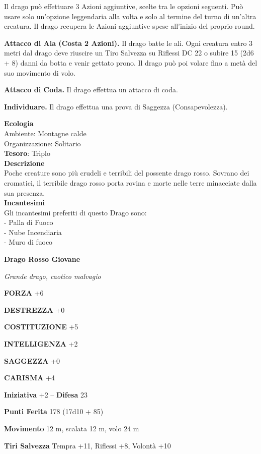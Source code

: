 \begin{multicols}{2}
Il drago può effettuare 3 Azioni aggiuntive, scelte tra le opzioni seguenti. Può usare solo un'opzione leggendaria alla volta e solo al termine del turno di un'altra creatura. Il drago recupera le Azioni aggiuntive spese all'inizio del proprio round.

\textbf{Attacco di Ala (Costa 2 Azioni).} Il drago batte le ali. Ogni creatura entro 3 metri dal drago deve riuscire un Tiro Salvezza su Riflessi DC 22 o subire 15 (2d6 + 8) danni da botta e venir gettato prono. Il drago può poi volare fino a metà del suo movimento di volo.

\textbf{Attacco di Coda.} Il drago effettua un attacco di coda.

\textbf{Individuare.} Il drago effettua una prova di Saggezza (Consapevolezza).

\textbf{Ecologia}\\
Ambiente: Montagne calde\\
Organizzazione: Solitario\\
\textbf{Tesoro}: Triplo\\
\textbf{Descrizione}\\
Poche creature sono più crudeli e terribili del possente drago rosso. Sovrano dei cromatici, il terribile drago rosso porta rovina e morte nelle terre minacciate dalla sua presenza.\\
\textbf{Incantesimi}\\
Gli incantesimi preferiti di questo Drago sono:\\
- Palla di Fuoco\\
- Nube Incendiaria\\
- Muro di fuoco


\medskip{}\textbf{Drago Rosso Giovane}

\textit{Grande drago, caotico malvagio}

\textbf{FORZA} +6

\textbf{DESTREZZA} +0

\textbf{COSTITUZIONE} +5

\textbf{INTELLIGENZA} +2

\textbf{SAGGEZZA} +0

\textbf{CARISMA} +4

\textbf{Iniziativa} +2 -- \textbf{Difesa} 23

\textbf{Punti Ferita} 178 (17d10 + 85)

\textbf{Movimento} 12 m, scalata 12 m, volo 24 m

\textbf{Tiri Salvezza} Tempra +11, Riflessi +8, Volontà +10


\end{multicols}
